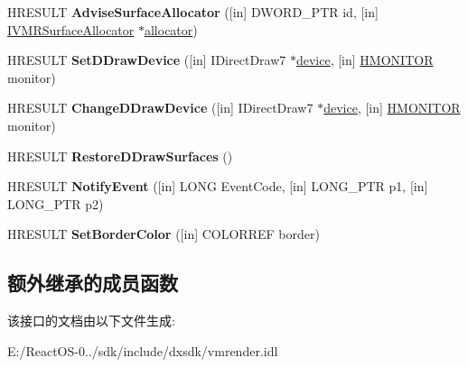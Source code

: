 \begin{DoxyCompactItemize}
\item 
\mbox{\label{interface_i_v_m_r_surface_allocator_notify_a12060efd91f5c438283cb21adcfe9cfc}} 
H\+R\+E\+S\+U\+LT {\bfseries Advise\+Surface\+Allocator} (\mbox{[}in\mbox{]} D\+W\+O\+R\+D\+\_\+\+P\+TR id, \mbox{[}in\mbox{]} \hyperlink{interface_i_v_m_r_surface_allocator}{I\+V\+M\+R\+Surface\+Allocator} $\ast$\hyperlink{classallocator}{allocator})
\item 
\mbox{\label{interface_i_v_m_r_surface_allocator_notify_adaa6589d6d63012b9e591330a10fa477}} 
H\+R\+E\+S\+U\+LT {\bfseries Set\+D\+Draw\+Device} (\mbox{[}in\mbox{]} I\+Direct\+Draw7 $\ast$\hyperlink{structdevice}{device}, \mbox{[}in\mbox{]} \hyperlink{interfacevoid}{H\+M\+O\+N\+I\+T\+OR} monitor)
\item 
\mbox{\label{interface_i_v_m_r_surface_allocator_notify_a49957a34fd6bb4d70df6fe4070f35eb7}} 
H\+R\+E\+S\+U\+LT {\bfseries Change\+D\+Draw\+Device} (\mbox{[}in\mbox{]} I\+Direct\+Draw7 $\ast$\hyperlink{structdevice}{device}, \mbox{[}in\mbox{]} \hyperlink{interfacevoid}{H\+M\+O\+N\+I\+T\+OR} monitor)
\item 
\mbox{\label{interface_i_v_m_r_surface_allocator_notify_a5efe60caa4ff4bc85523518a4289b97b}} 
H\+R\+E\+S\+U\+LT {\bfseries Restore\+D\+Draw\+Surfaces} ()
\item 
\mbox{\label{interface_i_v_m_r_surface_allocator_notify_a8f320ae3ea5e6964323db4a17796cea0}} 
H\+R\+E\+S\+U\+LT {\bfseries Notify\+Event} (\mbox{[}in\mbox{]} L\+O\+NG Event\+Code, \mbox{[}in\mbox{]} L\+O\+N\+G\+\_\+\+P\+TR p1, \mbox{[}in\mbox{]} L\+O\+N\+G\+\_\+\+P\+TR p2)
\item 
\mbox{\label{interface_i_v_m_r_surface_allocator_notify_a4b4ce7bbc725d218c3c1d2e1a5a6fcfb}} 
H\+R\+E\+S\+U\+LT {\bfseries Set\+Border\+Color} (\mbox{[}in\mbox{]} C\+O\+L\+O\+R\+R\+EF border)
\end{DoxyCompactItemize}
\subsection*{额外继承的成员函数}


该接口的文档由以下文件生成\+:\begin{DoxyCompactItemize}
\item 
E\+:/\+React\+O\+S-\/0../sdk/include/dxsdk/vmrender.\+idl\end{DoxyCompactItemize}
